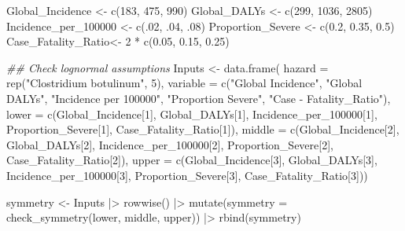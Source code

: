 \documentclass[
  letterpaper,
  DIV=11,
  numbers=noendperiod]{scrartcl}
\newenvironment{Shaded}{\begin{snugshade}}{\end{snugshade}}
\newcommand{\AttributeTok}[1]{\textcolor[rgb]{0.40,0.45,0.13}{#1}}
\newcommand{\DecValTok}[1]{\textcolor[rgb]{0.68,0.00,0.00}{#1}}
\newcommand{\DocumentationTok}[1]{\textcolor[rgb]{0.37,0.37,0.37}{\textit{#1}}}
\newcommand{\FloatTok}[1]{\textcolor[rgb]{0.68,0.00,0.00}{#1}}
\newcommand{\FunctionTok}[1]{\textcolor[rgb]{0.28,0.35,0.67}{#1}}
\newcommand{\NormalTok}[1]{\textcolor[rgb]{0.00,0.23,0.31}{#1}}
\newcommand{\OtherTok}[1]{\textcolor[rgb]{0.00,0.23,0.31}{#1}}
\newcommand{\SpecialCharTok}[1]{\textcolor[rgb]{0.37,0.37,0.37}{#1}}
\newcommand{\StringTok}[1]{\textcolor[rgb]{0.13,0.47,0.30}{#1}}
\begin{document}
\begin{Shaded}
\begin{Highlighting}[]
\NormalTok{Global\_Incidence }\OtherTok{\textless{}{-}} \FunctionTok{c}\NormalTok{(}\DecValTok{183}\NormalTok{, }\DecValTok{475}\NormalTok{, }\DecValTok{990}\NormalTok{)}
\NormalTok{Global\_DALYs }\OtherTok{\textless{}{-}} \FunctionTok{c}\NormalTok{(}\DecValTok{299}\NormalTok{, }\DecValTok{1036}\NormalTok{, }\DecValTok{2805}\NormalTok{)}
\NormalTok{Incidence\_per\_100000 }\OtherTok{\textless{}{-}} \FunctionTok{c}\NormalTok{(.}\DecValTok{02}\NormalTok{, .}\DecValTok{04}\NormalTok{, .}\DecValTok{08}\NormalTok{)}
\NormalTok{Proportion\_Severe }\OtherTok{\textless{}{-}} \FunctionTok{c}\NormalTok{(}\FloatTok{0.2}\NormalTok{, }\FloatTok{0.35}\NormalTok{, }\FloatTok{0.5}\NormalTok{)}
\NormalTok{Case\_Fatality\_Ratio}\OtherTok{\textless{}{-}} \DecValTok{2} \SpecialCharTok{*} \FunctionTok{c}\NormalTok{(}\FloatTok{0.05}\NormalTok{, }\FloatTok{0.15}\NormalTok{, }\FloatTok{0.25}\NormalTok{)}

\DocumentationTok{\#\# Check lognormal assumptions}
\NormalTok{Inputs }\OtherTok{\textless{}{-}} \FunctionTok{data.frame}\NormalTok{(}
 \AttributeTok{hazard =} \FunctionTok{rep}\NormalTok{(}\StringTok{"Clostridium botulinum"}\NormalTok{,  }\DecValTok{5}\NormalTok{), }
 \AttributeTok{variable =} \FunctionTok{c}\NormalTok{(}\StringTok{"Global Incidence"}\NormalTok{,  }\StringTok{"Global DALYs"}\NormalTok{,  }\StringTok{"Incidence per 100000"}\NormalTok{,  }\StringTok{"Proportion Severe"}\NormalTok{,  }\StringTok{"Case {-} Fatality\_Ratio"}\NormalTok{), }
 \AttributeTok{lower =} \FunctionTok{c}\NormalTok{(Global\_Incidence[}\DecValTok{1}\NormalTok{],  Global\_DALYs[}\DecValTok{1}\NormalTok{],  Incidence\_per\_100000[}\DecValTok{1}\NormalTok{],  Proportion\_Severe[}\DecValTok{1}\NormalTok{],  Case\_Fatality\_Ratio[}\DecValTok{1}\NormalTok{]), }
 \AttributeTok{middle =} \FunctionTok{c}\NormalTok{(Global\_Incidence[}\DecValTok{2}\NormalTok{],  Global\_DALYs[}\DecValTok{2}\NormalTok{],  Incidence\_per\_100000[}\DecValTok{2}\NormalTok{],  Proportion\_Severe[}\DecValTok{2}\NormalTok{],  Case\_Fatality\_Ratio[}\DecValTok{2}\NormalTok{]), }
 \AttributeTok{upper =} \FunctionTok{c}\NormalTok{(Global\_Incidence[}\DecValTok{3}\NormalTok{],  Global\_DALYs[}\DecValTok{3}\NormalTok{],  Incidence\_per\_100000[}\DecValTok{3}\NormalTok{],  Proportion\_Severe[}\DecValTok{3}\NormalTok{],  Case\_Fatality\_Ratio[}\DecValTok{3}\NormalTok{]))}

\NormalTok{symmetry }\OtherTok{\textless{}{-}}\NormalTok{ Inputs }\SpecialCharTok{|\textgreater{}}
 \FunctionTok{rowwise}\NormalTok{() }\SpecialCharTok{|\textgreater{}}
 \FunctionTok{mutate}\NormalTok{(}\AttributeTok{symmetry =} \FunctionTok{check\_symmetry}\NormalTok{(lower,  middle,  upper)) }\SpecialCharTok{|\textgreater{}} 
 \FunctionTok{rbind}\NormalTok{(symmetry)}


\end{Highlighting}
\end{Shaded}
\end{document}
